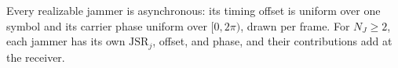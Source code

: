 \documentclass[conference]{IEEEtran}
\newcommand{\rar}[1]{{\color{blue}{[#1]}}}
\begin{document}
Every realizable jammer is asynchronous: its timing offset is uniform over one symbol and its carrier phase uniform over $[0,2\pi)$, drawn per frame.
For $N_J\!\ge\!2$, each jammer has its own $\mathrm{JSR}_j$, offset, and phase, and their contributions add at the receiver.
\rar{If MARL results will be included, this would mean we would add 3d space, possibly movement, path fading etc. to make it realistic and have something MARL can benefit from}

\end{document}
